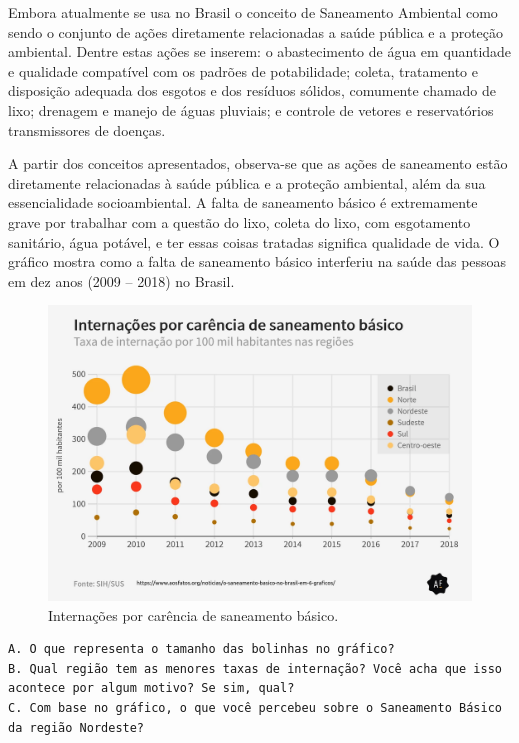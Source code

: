 \documentclass[
]{book}
\begin{document}
Embora atualmente se usa no Brasil o conceito de Saneamento Ambiental como sendo o conjunto de ações diretamente relacionadas a saúde pública e a proteção ambiental. Dentre estas ações se inserem: o abastecimento de água em quantidade e qualidade compatível com os padrões de potabilidade; coleta, tratamento e disposição adequada dos esgotos e dos resíduos sólidos, comumente chamado de lixo; drenagem e manejo de águas pluviais; e controle de vetores e reservatórios transmissores de doenças.

A partir dos conceitos apresentados, observa-se que as ações de saneamento estão diretamente relacionadas à saúde pública e a proteção ambiental, além da sua essencialidade socioambiental. A falta de saneamento básico é extremamente grave por trabalhar com a questão do lixo, coleta do lixo, com esgotamento sanitário, água potável, e ter essas coisas tratadas significa qualidade de vida. O gráfico mostra como a falta de saneamento básico interferiu na saúde das pessoas em dez anos (2009 -- 2018) no Brasil.

\begin{figure}

{\centering \includegraphics[width=0.75\linewidth,height=0.75\textheight]{images/Impactos/grafico-saneamento} 

}

\caption{Internações por carência de saneamento básico.}\label{fig:graficosaneamento}
\end{figure}

\begin{verbatim}
A. O que representa o tamanho das bolinhas no gráfico?
B. Qual região tem as menores taxas de internação? Você acha que isso acontece por algum motivo? Se sim, qual?
C. Com base no gráfico, o que você percebeu sobre o Saneamento Básico da região Nordeste?
\end{verbatim}
\end{document}
